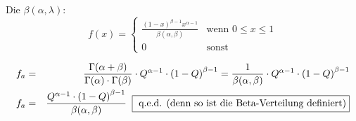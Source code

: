 \begin{uebsp}
\begin{Answer}
\begin{uebsp_theory}
Die  $\beta(\alpha, \lambda)$: 
    \[f(x) = \begin{cases} 
                \frac{(1-x)^{\beta-1} x^{\alpha-1}}{\beta(\alpha, \beta)} &\mbox{wenn } 0\leq x \leq 1 \\
                0 & \mbox{sonst}
                \end{cases}\]
\end{uebsp_theory}

\begin{eqnarray*}
f_a &=& \frac{\Gamma(\alpha+\beta)}{\Gamma(\alpha)\cdot \Gamma(\beta)}\cdot Q^{\alpha-1}\cdot \left(1-Q\right)^{\beta-1}=\frac{1}{\beta(\alpha, \beta)}\cdot Q^{\alpha-1}\cdot \left(1-Q\right)^{\beta-1}\\
f_a &=& \frac{Q^{\alpha-1}\cdot \left(1-Q\right)^{\beta-1}}{\beta(\alpha, \beta)}\;\;\fbox{ q.e.d. (denn so ist die Beta-Verteilung definiert)}
\end{eqnarray*}
\end{Answer}
\end{uebsp}
